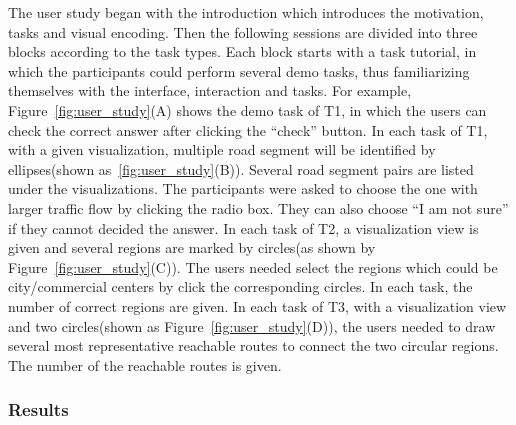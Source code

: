 The user study began with the introduction which introduces the motivation, tasks and visual encoding. Then the following sessions are divided into three blocks according to the task types. Each block starts with a task tutorial, in which the participants could perform several demo tasks, thus familiarizing themselves with the interface, interaction and tasks. For example, Figure~\ref{fig:user_study}(A) shows the demo task of T1, in which the users can check the correct answer after clicking the ``check'' button. 
In each task of T1, with a given visualization, multiple road segment will be identified by ellipses(shown as~\ref{fig:user_study}(B)). Several road segment pairs are listed under the visualizations. The participants were asked to choose the one with larger traffic flow by clicking the radio box. They can also choose ``I am not sure'' if they cannot decided the answer. 
In each task of T2, a visualization view is given and several regions are marked by circles(as shown by Figure~\ref{fig:user_study}(C)). The users needed select the regions which could be city/commercial centers by click the corresponding circles. In each task, the number of correct regions are given. 
In each task of T3, with a visualization view and two circles(shown as Figure~\ref{fig:user_study}(D)), the users needed to draw several most representative reachable routes to connect the two circular regions. The number of the reachable routes is given.  

\subsubsection{Results}



